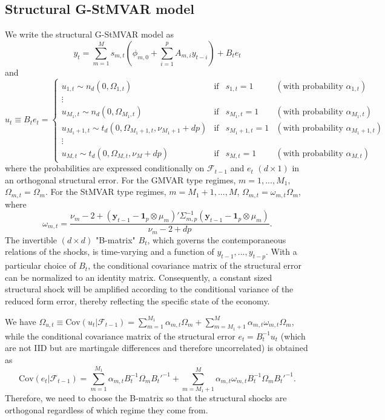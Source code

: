 \documentclass[nojss]{jss} %
\begin{document}
\subsection{Structural G-StMVAR model}\label{sec:structural_model}
We write the structural G-StMVAR model \citep{Virolainen2:2021} as
\begin{equation}
y_t = \sum_{m=1}^Ms_{m,t}(\phi_{m,0}+\sum_{i=1}^pA_{m,i}y_{t-i}) + B_te_t
\end{equation}
and
\begin{equation}
u_t\equiv B_te_t =
\left\lbrace\begin{matrix}
u_{1,t}\sim n_d(0,\Omega_{1,t}) & \text{if} & s_{1,t}=1 & (\text{with probability } \alpha_{1,t}) \\
\vdots & & & \\
u_{M_1,t}\sim n_d(0,\Omega_{M_1,t}) & \text{if} & s_{M_1,t}=1 & (\text{with probability } \alpha_{M_1,t}) \\
u_{M_1+1,t}\sim t_d(0,\Omega_{M_1+1,t},\nu_{M_1+1} + dp) & \text{if} & s_{M_1+1,t}=1 & (\text{with probability } \alpha_{M_1+1,t}) \\
\vdots & & & \\
u_{M,t}\sim t_d(0,\Omega_{M,t},\nu_M + dp) & \text{if} & s_{M,t}=1 & (\text{with probability } \alpha_{M,t})
\end{matrix}\right.
\end{equation}
where the probabilities are expressed conditionally on $\mathcal{F}_{t-1}$ and $e_t$ $(d \times 1)$ in an orthogonal structural error.  For the GMVAR type regimes, $m=1,...,M_1$‚ $\Omega_{m,t}=\Omega_m$.  For the StMVAR type regimes,  $m=M_1+1,...,M$,  $\Omega_{m,t}=\omega_{m,t}\Omega_m$, where
\begin{equation}\label{eq:sigma_mt}
\omega_{m,t} = \frac{\nu_m - 2 + (\boldsymbol{y}_{t-1} - \boldsymbol{1}_p\otimes\mu_m)'\Sigma_{m,p}^{-1}(\boldsymbol{y}_{t-1} - \boldsymbol{1}_p\otimes\mu_m)}{\nu_m - 2 + dp}.
\end{equation}
The invertible $(d\times d)$ "B-matrix" $B_t$, which governs the contemporaneous relations of the shocks, is time-varying and a function of $y_{t-1},..., y_{t-p}$. With a particular choice of $B_t$,  the conditional covariance matrix of the structural error can be normalized to an identity matrix. Consequently,  a constant sized structural shock will be amplified according to the conditional variance of the reduced form error, thereby reflecting the specific state of the economy.

We have $\Omega_{u,t}\equiv\text{Cov}(u_t|\mathcal{F}_{t-1})=\sum_{m=1}^{M_1}\alpha_{m,t}\Omega_m + \sum_{m=M_1+1}^{M}\alpha_{m,t}\omega_{m,t}\Omega_m$,  while the conditional covariance matrix of the structural error $e_t=B_t^{-1}u_t$ (which are not IID but are martingale differences and therefore uncorrelated) is obtained as
\begin{equation}
\text{Cov}(e_t|\mathcal{F}_{t-1})=\sum_{m=1}^{M_1}\alpha_{m,t}B_t^{-1}\Omega_mB_t'^{-1} + \sum_{m=M_1+1}^{M}\alpha_{m,t}\omega_{m,t}B_t^{-1}\Omega_mB_t'^{-1}.
\end{equation}
Therefore, we need to choose the B-matrix so that the structural shocks are orthogonal regardless of which regime they come from.
\end{document}
